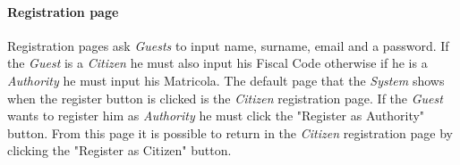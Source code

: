 \documentclass{article}
\begin{document}
\clearpage

\paragraph{Registration page}
Registration pages ask \textit{Guests} to input name, surname, email and a password. If the \textit{Guest} is a \textit{Citizen}
he must also input his Fiscal Code otherwise if he is a \textit{Authority} he must input his Matricola. The default page that the 
\textit{System} shows when the register button is clicked is the \textit{Citizen} registration page. If the \textit{Guest} wants
to register him as \textit{Authority} he must click the "Register as Authority" button. From this page it is possible
to return in the \textit{Citizen} registration page by clicking the "Register as Citizen" button.   
\\
\\
\\
\\
\end{document}
